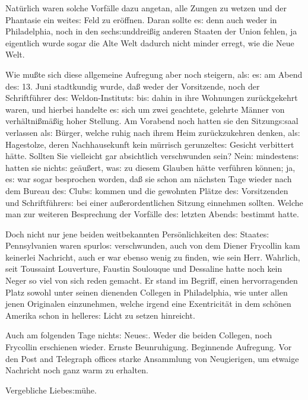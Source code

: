 \documentclass[oneside,12pt]{book}
\newenvironment{antiqua}{\normalfont}{}
\newcommand{\s}{s:}
\begin{document}
Nat\"urlich waren solche Vorf\"alle dazu angetan, alle Zungen zu
wetzen und der Phantasie ein weite{\s} Feld zu er\"offnen. Daran
sollte e{\s} denn auch weder in Philadelphia, noch in den
sech{\s}unddrei{\ss}ig anderen Staaten der Union fehlen, ja
eigentlich wurde sogar die Alte Welt dadurch nicht minder erregt, wie
die Neue Welt.

Wie mu{\ss}te sich diese allgemeine Aufregung aber noch steigern,
al{\s} e{\s} am Abend de{\s} 13. Juni stadtkundig wurde, da{\ss}
weder der Vorsitzende, noch der Schriftf\"uhrer de{\s}
Weldon-Institut{\s} bi{\s} dahin in ihre Wohnungen zur\"uckgekehrt
waren, und hierbei handelte e{\s} sich um zwei geachtete, gelehrte
M\"anner von verh\"altni{\ss}m\"a{\ss}ig hoher Stellung. Am Vorabend
noch hatten sie den Sitzung{\s}saal verlassen al{\s} B\"urger, welche
ruhig nach ihrem Heim zur\"uckzukehren denken, al{\s} Hagestolze,
deren Nachhausekunft kein m\"urrisch gerunzelte{\s} Gesicht
verbittert h\"atte. Sollten Sie vielleicht gar absichtlich
verschwunden sein? Nein: mindesten{\s} hatten sie nicht{\s}
ge\"au{\ss}ert, wa{\s} zu diesem Glauben h\"atte verf\"uhren
k\"onnen; ja, e{\s} war sogar besprochen worden, da{\ss} sie schon am
n\"achsten Tage wieder nach dem Bureau de{\s} Club{\s} kommen und die
gewohnten Pl\"atze de{\s} Vorsitzenden und Schriftf\"uhrer{\s} bei
einer au{\ss}erordentlichen Sitzung einnehmen sollten. Welche man zur
weiteren Besprechung der Vorf\"alle de{\s} letzten Abend{\s} bestimmt
hatte.

Doch nicht nur jene beiden weitbekannten Pers\"onlichkeiten de{\s}
Staate{\s} Pennsylvanien waren spurlo{\s} verschwunden, auch von dem
Diener Frycollin kam keinerlei Nachricht, auch er war ebenso wenig zu
finden, wie sein Herr. Wahrlich, seit Toussaint Louverture, Faustin
Soulouque und Dessaline hatte noch kein Neger so viel von sich reden
gemacht. Er stand im Begriff, einen hervorragenden Platz sowohl unter
seinen dienenden Collegen in Philadelphia, wie unter allen jenen
Originalen einzunehmen, welche irgend eine Exentricit\"at in dem
sch\"onen Amerika schon in hellere{\s} Licht zu setzen hinreicht.

Auch am folgenden Tage nicht{\s} Neue{\s}. Weder die beiden Collegen,
noch Frycollin erschienen wieder. Ernste Beunruhigung. Beginnende
Aufregung. Vor den \begin{antiqua}Post and Telegraph
offices\end{antiqua} starke Ansammlung von Neugierigen, um etwaige
Nachricht noch ganz warm zu erhalten.

Vergebliche Liebe{\s}m\"uhe.
\end{document}
